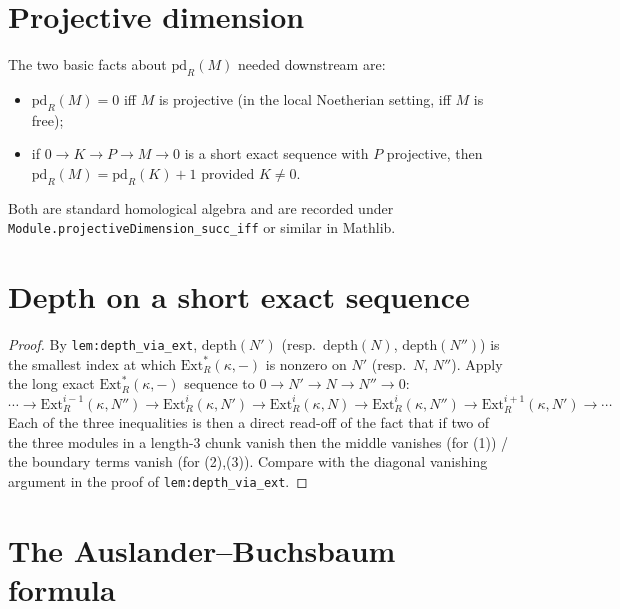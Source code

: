 \section{Projective dimension}
\label{sec:ab_pd}


The two basic facts about \(\text{pd}_R(M)\) needed downstream are:
\begin{itemize}
  \item \(\text{pd}_R(M) = 0\) iff \(M\) is projective (in the local Noetherian setting,
    iff \(M\) is free);
  \item if \(0 \to K \to P \to M \to 0\) is a short exact sequence with \(P\) projective, then
    \(\text{pd}_R(M) = \text{pd}_R(K) + 1\) provided \(K \neq 0\).
\end{itemize}
Both are standard homological algebra and are recorded under
\texttt{Module.projectiveDimension\_succ\_iff} or similar in Mathlib.

\section{Depth on a short exact sequence}
\label{sec:ab_depth_ses}


\begin{proof}
  
  
\leanok
  By \texttt{lem:depth_via_ext}, \(\text{depth}(N')\) (resp.\ \(\text{depth}(N)\),
  \(\text{depth}(N'')\)) is the smallest index at which \(\text{Ext}^*_R(\kappa, -)\) is
  nonzero on \(N'\) (resp.\ \(N\), \(N''\)). Apply the long exact \(\text{Ext}^*_R(\kappa, -)\)
  sequence to \(0 \to N' \to N \to N'' \to 0\):
  \[
    \cdots \to \text{Ext}^{i-1}_R(\kappa, N'')
    \to \text{Ext}^i_R(\kappa, N')
    \to \text{Ext}^i_R(\kappa, N)
    \to \text{Ext}^i_R(\kappa, N'')
    \to \text{Ext}^{i+1}_R(\kappa, N') \to \cdots
  \]
  Each of the three inequalities is then a direct read-off of the fact that if two
  of the three modules in a length-3 chunk vanish then the middle vanishes (for (1)) /
  the boundary terms vanish (for (2),(3)). Compare with the diagonal vanishing argument in
  the proof of \texttt{lem:depth_via_ext}.
\end{proof}

\section{The Auslander--Buchsbaum formula}
\label{sec:ab_main}

